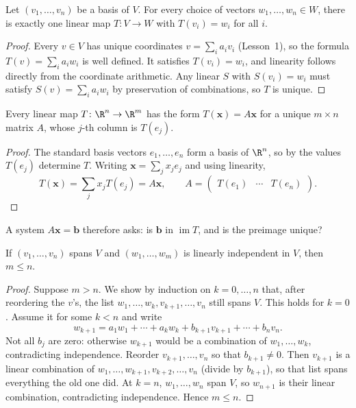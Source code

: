 \begin{theorem}\label{thm:basis-determines-map}
Let $(v_1,\ldots,v_n)$ be a basis of $V$. For every choice of vectors
$w_1,\ldots,w_n\in W$, there is exactly one linear map $T\colon V\to W$
with $T(v_i)=w_i$ for all $i$.
\end{theorem}

\begin{proof}
Every $v\in V$ has unique coordinates $v=\sum_i a_iv_i$ (Lesson~1), so
the formula $T(v)=\sum_i a_iw_i$ is well defined. It satisfies
$T(v_i)=w_i$, and linearity follows directly from the coordinate
arithmetic. Any linear $S$ with $S(v_i)=w_i$ must satisfy
$S(v)=\sum_i a_iw_i$ by preservation of combinations, so $T$ is unique.
\end{proof}

\begin{theorem}\label{thm:maps-are-matrices}
Every linear map $T\colon\R^n\to\R^m$ has the form $T(\mathbf{x})=A\mathbf{x}$
for a unique $m\times n$ matrix $A$, whose $j$-th column is $T(e_j)$.
\end{theorem}

\begin{proof}
The standard basis vectors $e_1,\ldots,e_n$ form a basis of $\R^n$, so by
 the values $T(e_j)$ determine $T$. Writing
$\mathbf{x}=\sum_j x_je_j$ and using linearity,
\[
  T(\mathbf{x})=\sum_j x_jT(e_j)=A\mathbf{x},
  \qquad A=\begin{pmatrix}T(e_1)&\cdots&T(e_n)\end{pmatrix}.
\]
\end{proof}

A system $A\mathbf{x}=\mathbf{b}$ therefore asks: is $\mathbf{b}$ in
$\operatorname{im}T$, and is the preimage unique?

\begin{lemma}\label{lem:exchange}
If $(v_1,\ldots,v_n)$ spans $V$ and $(w_1,\ldots,w_m)$ is linearly
independent in $V$, then $m\le n$.
\end{lemma}

\begin{proof}
Suppose $m>n$. We show by induction on $k=0,\ldots,n$ that, after
reordering the $v$'s, the list $w_1,\ldots,w_k,v_{k+1},\ldots,v_n$ still
spans $V$. This holds for $k=0$. Assume it for some $k<n$ and write
\[
  w_{k+1}=a_1w_1+\cdots+a_kw_k+b_{k+1}v_{k+1}+\cdots+b_nv_n.
\]
Not all $b_j$ are zero: otherwise $w_{k+1}$ would be a combination of
$w_1,\ldots,w_k$, contradicting independence. Reorder
$v_{k+1},\ldots,v_n$ so that $b_{k+1}\ne0$. Then $v_{k+1}$ is a linear
combination of $w_1,\ldots,w_{k+1},v_{k+2},\ldots,v_n$ (divide by
$b_{k+1}$), so that list spans everything the old one did. At $k=n$,
$w_1,\ldots,w_n$ span $V$, so $w_{n+1}$ is their linear combination,
contradicting independence. Hence $m\le n$.
\end{proof}

